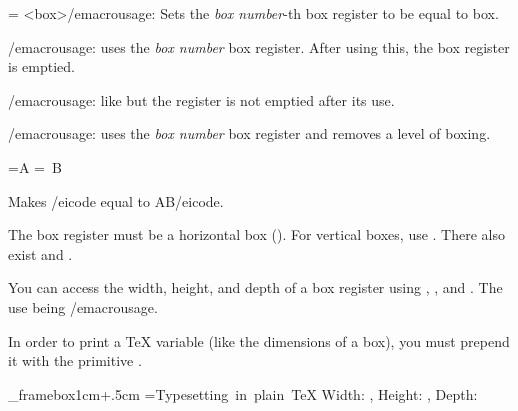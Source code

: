 {{    \textbox\empty{4cm}{\lastoy}{\hsize-5cm}{}
        \macrousage{} = <box>/emacrousage: Sets the {\it box number}-th box register to be equal to
        {\fifteentt box}.
    \endtextbox

    \textbox{}
        \centerline{\color{white}\macroname\box}
    \endtextbox

    \textbox\empty{4cm}{\lastoy}{\hsize-5cm}{}
        \macrousage{}/emacrousage: uses the {\it box number} box register.
        After using this, the box register is emptied.
    \endtextbox

    \textbox{}
        \centerline{\color{white}\macroname\copy}
    \endtextbox

    \textbox\empty{4cm}{\lastoy}{\hsize-5cm}{}
        \macrousage{}/emacrousage: like \macroname\box{} but the register is not emptied after its use.
    \endtextbox

    \textbox{}
        \centerline{\color{white}\macroname\unhbox}
    \endtextbox

    \textbox\empty{4cm}{\lastoy}{\hsize-5cm}{}
        \macrousage{}/emacrousage: uses the {\it box number} box register and removes a level of boxing.

\beginhi
{}=\hbox{A} =\hbox{ B}
\endhi

        Makes \icode {}/eicode{} equal to \icode \hbox{AB}/eicode.

        The box register must be a horizontal box (\macroname\hbox).
        For vertical boxes, use \macroname\unvbox.
        There also exist \macroname\unhcopy{} and \macroname\unvcopy.
    \endtextbox

\endslide

\beginslide
    \bheadline

    \textbox\empty{1cm}{2cm}{\hsize-2cm}{}
        You can access the width, height, and depth of a box register using \macroname\wd, \macroname\ht, and \macroname\dp.
        The use being \macrousage {}/emacrousage.

        In order to print a \TeX{} variable (like the dimensions of a box), you must prepend it with the primitive \macroname\the.
    \endtextbox

    \textbox\_framebox{1cm}{\lastey+.5cm}{\hsize-2cm}{}
\beginhi
{}=\hbox{Typesetting in plain \TeX}
Width: \the{}, Height: \the{}, Depth: \the{}
\endhi
    \endtextbox

}}
